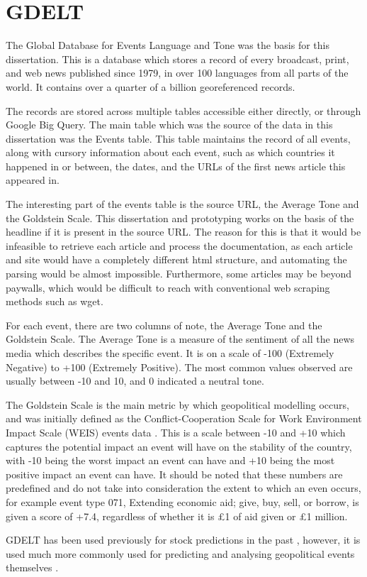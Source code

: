 \section{GDELT}

The Global Database for Events Language and Tone was the basis for this dissertation. This is a database which stores a record of every broadcast, print, and web news published since 1979, in over 100 languages from all parts of the world. It contains over a quarter of a billion georeferenced records. 

The records are stored across multiple tables accessible either directly, or through Google Big Query. The main table which was the source of the data in this dissertation was the Events table. This table maintains the record of all events, along with cursory information about each event, such as which countries it happened in or between, the dates, and the URLs of the first news article this appeared in.

The interesting part of the events table is the source URL, the Average Tone and the Goldstein Scale. This dissertation and prototyping works on the basis of the headline if it is present in the source URL. The reason for this is that it would be infeasible to retrieve each article and process the documentation, as each article and site would have a completely different html structure, and automating the parsing would be almost impossible. Furthermore, some articles may be beyond paywalls, which would be difficult to reach with conventional web scraping methods such as wget.

For each event, there are two columns of note, the Average Tone and the Goldstein Scale. The Average Tone is a measure of the sentiment of all the news media which describes the specific event. It is on a scale of -100 (Extremely Negative) to +100 (Extremely Positive). The most common values observed are usually between -10 and 10, and 0 indicated a neutral tone. 

The Goldstein Scale is the main metric by which geopolitical modelling occurs, and was initially defined as the Conflict-Cooperation Scale for Work Environment Impact Scale (WEIS) events data \cite{goldstein1992conflict}. This is a scale between -10 and +10 which captures the potential impact an event will have on the stability of the country, with -10 being the worst impact an event can have and +10 being the most positive impact an event can have. It should be noted that these numbers are predefined and do not take into consideration the extent to which an even occurs, for example event type 071, Extending economic aid; give, buy, sell, or borrow, is given a score of +7.4, regardless of whether it is £1 of aid given or £1 million. 

GDELT has been used previously for stock predictions in the past \cite{memari2017predicting} \cite{alamro2019predicting}, however, it is used much more commonly used for predicting and analysing geopolitical events themselves \cite{qiao2017predicting} \cite{yonamine2013predicting}. 